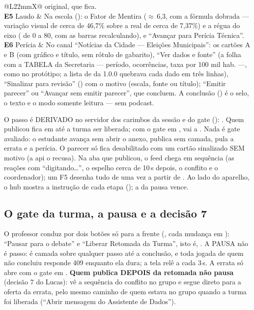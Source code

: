 \begin{tabularx}{\linewidth}{@{}L{22mm}X@{}}
  original, que fica.\\
\zebra \textbf{E5} Laudo & Na escola (): o Fator de Mentira
  ($\approx$\,6,3, com a fórmula dobrada --- variação visual de cerca de
  46,7\% sobre a real de cerca de 7,37\%) e a régua do eixo ( de 0
  a 80, com as barras recalculando), e \enquote{Avançar para Perícia
  Técnica}.\\
\textbf{E6} Perícia & No canal \enquote{Notícias da Cidade --- Eleições
  Municipais}: os cartões A e B (com gráfico e título, sem rótulo de
  gabarito), \enquote{Ver dados e fonte} (a folha com a TABELA da
  Secretaria --- período, ocorrências, taxa por 100 mil hab. ---, como no
  protótipo; a lista de  da 1.0.0 quebrava cada dado em três
  linhas), \enquote{Sinalizar para revisão} () com o motivo
  (escala, fonte ou título); \enquote{Emitir parecer} ou \enquote{Avançar sem
  emitir parecer}, que concluem. A conclusão () é o selo, o
  texto e o modo somente leitura --- sem podcast.\\
\bottomrule
\end{tabularx}

O passo é DERIVADO no servidor dos carimbos da sessão e do gate
():  \seta{}  \seta{}
 \seta{}  \seta{}  \seta{} 
\seta{}  \seta{} . Quem publicou fica em 
até a turma ser liberada; com o gate em , vai a .
Nada é gate avaliado: o estudante avança sem abrir o anexo, publica sem
camada, pula a errata e a perícia. O parecer só fica desabilitado com um
cartão sinalizado SEM motivo (a api o recusa). Na aba que publicou, o feed
chega em sequência (as reações com \enquote{digitando\ldots}, o espelho cerca
de 10\,s depois, o conflito e o coordenador); um F5 desenha tudo de uma vez a
partir de . Ao lado do aparelho, o hub mostra a
instrução de cada etapa (); a da pausa vence.

\subsection{O gate da turma, a pausa e a decisão 7}

O professor conduz por dois botões só para a frente
(, cada mudança em
): \enquote{Pausar para o debate} e
\enquote{Liberar Retomada da Turma}, isto é,  \seta{}
 \seta{} . A PAUSA não é passo: é camada sobre qualquer
passo até a conclusão, e toda jogada de quem não concluiu responde 409
 enquanto ela dura; a tela relê  a
cada 3\,s. A errata só abre com o gate em . \textbf{Quem publica
DEPOIS da retomada não pausa} (decisão 7 do Lucas): vê a sequência do conflito
no grupo e segue direto para a oferta da errata, pelo mesmo caminho de quem
estava no grupo quando a turma foi liberada (\enquote{Abrir mensagem do
Assistente de Dados}).

